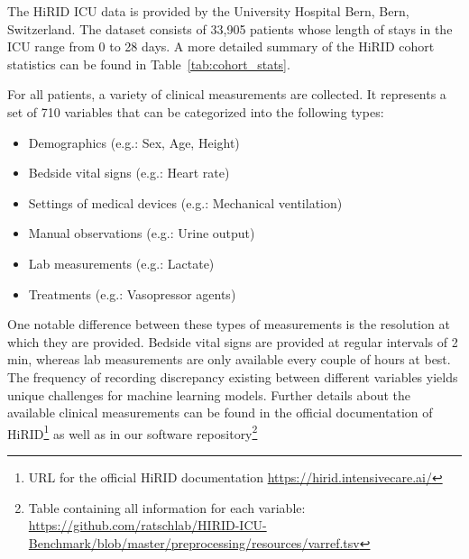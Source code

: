 \documentclass{article}
\begin{document}
The HiRID ICU data is provided by the University Hospital Bern, Bern, Switzerland.
The dataset consists of 33,905 patients whose length of stays in the ICU range from 0 to 28 days. A more detailed summary of the HiRID cohort statistics can be found in Table~\ref{tab:cohort_stats}.

For all patients, a variety of clinical measurements are collected. It represents a set of 710 variables that can be categorized into the following types:
\begin{itemize}
    \item Demographics (e.g.: Sex, Age, Height)
    \item Bedside vital signs (e.g.: Heart rate)
    \item Settings of medical devices (e.g.: Mechanical ventilation)
    \item Manual observations (e.g.: Urine output)
    \item Lab measurements (e.g.: Lactate)
    \item Treatments (e.g.: Vasopressor agents)
\end{itemize}

One notable difference between these types of measurements is the resolution at which they are provided. Bedside vital signs are provided at regular intervals of 2 min, whereas lab measurements are only available every couple of hours at best. The frequency of recording discrepancy existing between different variables yields unique challenges for machine learning models. Further details about the available clinical measurements can be found in the official documentation of HiRID\footnote{URL for the official HiRID documentation \url{https://hirid.intensivecare.ai/}} as well as in our software repository\footnote{ Table containing all information for each variable: \url{https://github.com/ratschlab/HIRID-ICU-Benchmark/blob/master/preprocessing/resources/varref.tsv}}
\end{document}
